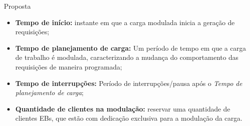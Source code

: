 \begin{frame}{Proposta}
	\begin{itemize}
		
		\item \textbf{Tempo de início:} instante em que a carga modulada inicia a geração de requisições;
		
		\item \textbf{Tempo de planejamento de carga:} Um período de tempo em que a carga de trabalho é modulada, caracterizando a mudança do comportamento das requisições de maneira programada;
		
		\item \textbf{Tempo de interrupções:} Período de interrupções/pausa após o \textit{Tempo de planejamento de carga};
		
		\item \textbf{Quantidade de clientes na modulação:} reservar uma quantidade de clientes EBs, que estão com dedicação exclusiva para a modulação da carga.
	\end{itemize}	
\end{frame}



